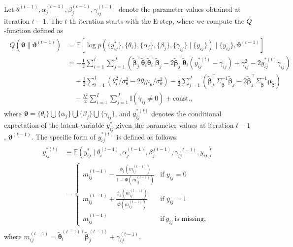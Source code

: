 \documentclass[11pt]{article}
\begin{document}
Let $ \theta^{(t-1)}, \alpha_j^{(t-1)}, \beta_j^{(t-1)}, \gamma_{ij}^{(t-1)} $ denote the parameter values obtained at iteration $ t-1 $. The $ t $-th iteration starts with the E-step, where we compute the $Q$-function defined as
\begin{align}\label{eqn:q_func}
    \begin{split}
        Q(\boldsymbol{\vartheta} \parallel \boldsymbol{\vartheta}^{(t-1)}) &= \mathbb{E}\left[ \log p(\{y_{ij}^*\}, \{\theta_i\}, \{\alpha_j\}, \{\beta_j\}, \{\gamma_{ij}\} \mid \{y_{ij}\}) \mid \{y_{ij}\}, \boldsymbol{\vartheta}^{(t-1)}\right]\\
        &= -\frac{1}{2} \sum_{i = 1}^I \sum_{j = 1}^J \left( \boldsymbol{\tilde{\beta}}_j^\top \boldsymbol{\tilde{\theta}}_i \boldsymbol{\tilde{\theta}}_i^\top \boldsymbol{\tilde{\beta}}_j -2 \boldsymbol{\tilde{\beta}}_j^\top \boldsymbol{\tilde{\theta}}_i (y_{ij}^{*(t)} - \gamma_{ij})  + \gamma_{ij}^2 -2 y_{ij}^{*(t)} \gamma_{ij}\right)\\
        &\quad -\frac{1}{2} \sum_{i = 1}^I \left(\theta_i^2 /\sigma_{{\theta}}^2 - 2\theta_i \mu_{\theta}/\sigma_{\theta}^2\right) 
        -\frac{1}{2} \sum_{j = 1}^J \left(\boldsymbol{\tilde{\beta}}_j^\top \Sigma_{{\boldsymbol{\tilde{\beta}}}}^{-1} \boldsymbol{\tilde{\beta}}_j - 2\boldsymbol{\tilde{\beta}}_j^\top \Sigma^{-1}_{\boldsymbol{\tilde{\beta}}}\boldsymbol{\mu}_{\boldsymbol{\tilde{\beta}}}\right) \\
        &\quad -\frac{\lambda^2}{2} \sum_{i = 1}^I \sum_{j = 1}^J \mathbb{I}(\gamma_{ij} \neq 0) + \text{const.},
    \end{split}
\end{align}
where $\boldsymbol{\vartheta} = \{\theta_i\}\bigcup \{\alpha_j\} \bigcup \{\beta_j\}\bigcup \{\gamma_{ij}\}$, and $ y_{ij}^{*(t)} $ denotes the conditional expectation of the latent variable $y_{ij}^*$ given the parameter values at iteration $ t-1 $, $\boldsymbol{\vartheta}^{(t-1)}$. The specific form of $y_{ij}^{*(t)}$ is defined as follows:
\begin{align}\label{eqn:y_star}
\begin{split}
    y_{ij}^{*(t)} &\equiv \mathbb{E} \left(y_{ij}^* \mid \theta_i^{(t-1)}, \alpha_j^{(t-1)},  \beta_j^{(t-1)}, \gamma_{ij}^{(t-1)}, y_{ij}\right) \\
    &= \begin{cases}
        m_{ij}^{(t-1)} - \frac{\phi_1(m_{ij}^{(t-1)})}{1-\Phi(m_{ij}^{(t-1)})} & \text{if } y_{ij} = 0\\
        m_{ij}^{(t-1)} + \frac{\phi_1(m_{ij}^{(t-1)})}{\Phi(m_{ij}^{(t-1)})} & \text{if } y_{ij} = 1\\
        m_{ij}^{(t-1)} & \text{if} ~y_{ij }~ \text{is missing},
    \end{cases}
\end{split}
\end{align}
where $m_{ij}^{(t-1)} = \boldsymbol{\tilde{\theta}}_i^{(t-1)\top} \boldsymbol{\tilde{\beta}}_j^{(t-1)} + \gamma_{ij}^{(t-1)}$.
\end{document}
